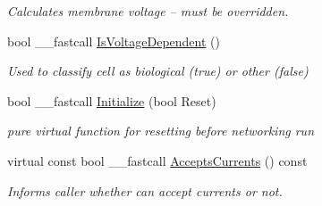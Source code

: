 \begin{DoxyCompactItemize}
\begin{DoxyCompactList}\small\item\em Calculates membrane voltage -- must be overridden. \end{DoxyCompactList}\item 
\hypertarget{class_t_model_cell_a803808cc5f1c906df5d5b1b2d33bd3fa}{bool \+\_\+\+\_\+fastcall \hyperlink{class_t_model_cell_a803808cc5f1c906df5d5b1b2d33bd3fa}{Is\+Voltage\+Dependent} ()}\label{class_t_model_cell_a803808cc5f1c906df5d5b1b2d33bd3fa}

\begin{DoxyCompactList}\small\item\em Used to classify cell as biological (true) or other (false) \end{DoxyCompactList}\item 
\hypertarget{class_t_model_cell_a402870531adc0f74fe1785db3c3ee74f}{bool \+\_\+\+\_\+fastcall \hyperlink{class_t_model_cell_a402870531adc0f74fe1785db3c3ee74f}{Initialize} (bool Reset)}\label{class_t_model_cell_a402870531adc0f74fe1785db3c3ee74f}

\begin{DoxyCompactList}\small\item\em pure virtual function for resetting before networking run \end{DoxyCompactList}\item 
\hypertarget{class_t_model_cell_a2beab2b6327c27d8fc962f158959362c}{virtual const bool \+\_\+\+\_\+fastcall \hyperlink{class_t_model_cell_a2beab2b6327c27d8fc962f158959362c}{Accepts\+Currents} () const }\label{class_t_model_cell_a2beab2b6327c27d8fc962f158959362c}

\begin{DoxyCompactList}\small\item\em Informs caller whether can accept currents or not. \end{DoxyCompactList}\end{DoxyCompactItemize}
